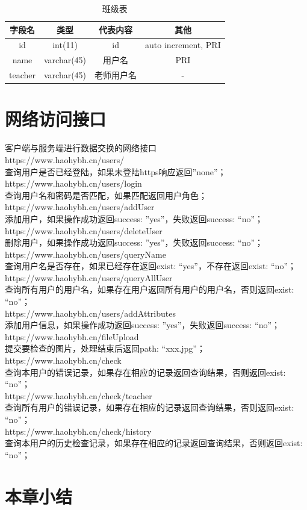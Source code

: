 \begin{table}[h!]
\begin{center}
\caption{班级表}
\begin{tabular}{|c|c|c|c|}
\hline
 字段名 & 类型 & 代表内容 & 其他\\
\hline
id & int(11) & id & auto increment, PRI \\
\hline
name & varchar(45) & 用户名 & PRI \\
\hline
 teacher & varchar(45) & 老师用户名 & - \\
 \hline
\end{tabular}
\end{center}
\end{table}
\newpage

\section{网络访问接口}
客户端与服务端进行数据交换的网络接口\\
https://www.haohybh.cn/users/\\
查询用户是否已经登陆，如果未登陆https响应返回”none”；\\
https://www.haohybh.cn/users/login\\
查询用户名和密码是否匹配，如果匹配返回用户角色；\\
https://www.haohybh.cn/users/addUser\\
添加用户，如果操作成功返回{success: ”yes”}，失败返回{success: “no”}；\\
https://www.haohybh.cn/users/deleteUser\\
删除用户，如果操作成功返回{success: ”yes”}，失败返回{success: “no”}；\\
https://www.haohybh.cn/users/queryName\\
查询用户名是否存在，如果已经存在返回{exist: “yes”}，不存在返回{exist: “no”}；\\
https://www.haohybh.cn/users/queryAllUser\\
查询所有用户的用户名，如果存在用户返回所有用户的用户名，否则返回{exist: “no”}；\\
https://www.haohybh.cn/users/addAttributes\\
添加用户信息，如果操作成功返回{success: ”yes”}，失败返回{success: “no”}；\\
https://www.haohybh.cn/fileUpload\\
提交要检查的图片，处理结束后返回{path: “xxx.jpg”}；\\
https://www.haohybh.cn/check\\
查询本用户的错误记录，如果存在相应的记录返回查询结果，否则返回{exist: “no”}；\\
https://www.haohybh.cn/check/teacher\\
查询所有用户的错误记录，如果存在相应的记录返回查询结果，否则返回{exist: “no”}；\\
https://www.haohybh.cn/check/history\\
查询本用户的历史检查记录，如果存在相应的记录返回查询结果，否则返回{exist: “no”}；\\

\section{本章小结}














